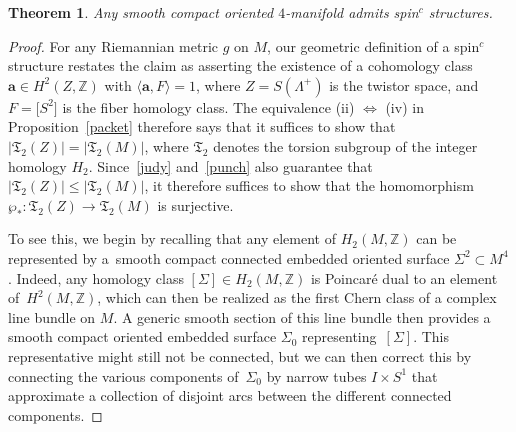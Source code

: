 \documentclass[pdftex]{sigma}
\numberwithin{equation}{section}
\newtheorem{Theorem}{Theorem}[section]
\def\ZZ{\mathbb{Z}}
\begin{document}
\begin{Theorem}\label{existence} Any smooth compact oriented $4$-manifold admits spin$^c$ structures.
\end{Theorem}
\begin{proof}
For any Riemannian metric $g$ on $M$, our geometric definition of a spin$^c$ structure restates the claim as asserting the existence of
a cohomology class $\mathbf{a}\in H^2(Z, \ZZ)$ with $\langle \mathbf{a} , F\rangle =1$,
where $Z= S(\Lambda^+)$ is the twistor space, and $F= \big[S^2\big]$ is the fiber homology class. The equivalence
(ii) $\Longleftrightarrow$ (iv) in Proposition~\ref{packet} therefore says that it suffices to
 show that $|\mathfrak{T}_2 (Z)| = |\mathfrak{T}_2 (M)|$, where $\mathfrak{T}_2$ denotes the torsion subgroup of the
integer homology $H_2$. Since~\eqref{judy} and~\eqref{punch} also guarantee that
$|\mathfrak{T}_2 (Z)| \leq |\mathfrak{T}_2 (M)|$, it therefore suffices to show that the homomorphism
$\wp_* \colon \mathfrak{T}_2 (Z)\to \mathfrak{T}_2 (M)$ is surjective.

To see this, we begin by recalling that any element of $H_2(M,\ZZ)$ can be represented by a~smooth compact connected embedded oriented surface $\Sigma^2 \subset M^4$. Indeed, any homology class
$[\Sigma ]\in H_2 (M, \ZZ )$ is Poincar\'e dual to an element of~$H^2(M, \ZZ)$, which can then be
realized as the first Chern class of a complex line bundle on $M$. A generic smooth section of
this line bundle then provides a smooth compact oriented embedded surface ${\Sigma}_0$ representing~$[\Sigma]$.
This representative might still not be connected, but we can then correct this by connecting the various components of~${\Sigma}_0$
by narrow tubes $I \times S^1$ that approximate a collection of disjoint arcs between the different connected components.


\end{proof}
\end{document}
